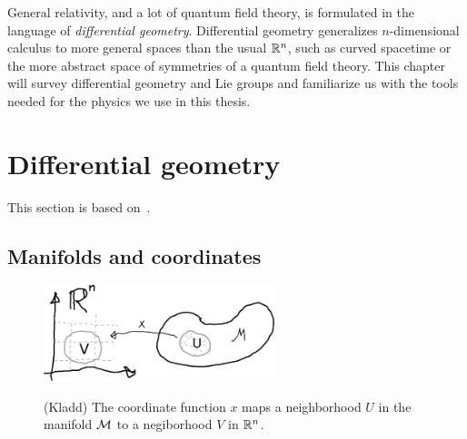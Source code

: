 General relativity, and a lot of quantum field theory, is formulated in the language of \emph{differential geometry}.
Differential geometry generalizes $n$-dimensional calculus to more general spaces than the usual $\mathbb{R}^n$, such as curved spacetime or the more abstract space of symmetries of a quantum field theory.
This chapter will survey differential geometry and Lie groups and familiarize us with the tools needed for the physics we use in this thesis.

\section{Differential geometry}
\label{section: differential geometry}

This section is based on~\autocite{carrollSpacetimeGeometryIntroduction2019,leeIntroductionSmoothManifolds2003d}.

\subsection{Manifolds and coordinates}

\begin{figure}[ht]
    \centering
    \includegraphics[width=0.6\textwidth]{figurer/coordinate_function.pdf}
    \label{coordinate function}
    \caption{(Kladd) The coordinate function $x$ maps a neighborhood $U$ in the manifold $\mathcal{M}$ to a negiborhood $V$ in $\mathbb{R}^n$.}
\end{figure}

